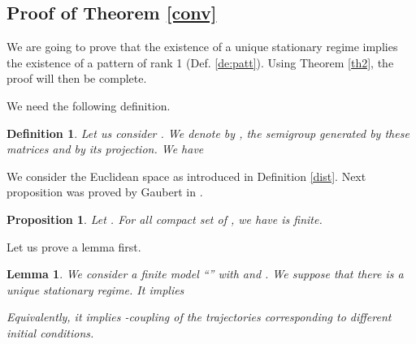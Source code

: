 \documentclass[11pt,titlepage]{article}
\newtheorem{lemm}[theo]{Lemma }
\newtheorem{prop}[theo]{Proposition }
\newtheorem{defi}[theo]{Definition }
\begin{document}
\subsection{Proof of Theorem \protect\ref{conv} } 
\label{app:conv}
We are going to prove that the existence of a unique stationary regime
implies the existence of a pattern of rank 1 (Def. \ref{de:patt}). 
Using Theorem \ref{th2}, the proof will then be complete.

We need the following definition.
\begin{defi}
\label{de-semi}
Let us consider .
We denote by , the semigroup generated by these matrices 
and by  its projection. We have

\end{defi}

We consider the Euclidean space 
as introduced in Definition \ref{dist}. 
Next proposition was proved by Gaubert in \cite{gaub94b}.

\begin{prop}
\label{pr-gaub}
Let . 
For all compact set  of , we have
 is finite. 
\end{prop}

Let us prove a lemma first.
\begin{lemm}
\label{le:boug}
We consider a finite model ``''
with  and .
We suppose that there is a
unique stationary regime. It implies

Equivalently, it implies -coupling of the trajectories
corresponding to different initial conditions.
\end{lemm}
\end{document}
